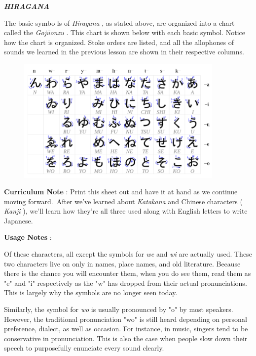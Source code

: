\par{\textbf{\emph{HIRAGANA }}}

\par{ The basic symbo ls of \emph{Hiragana }, as stated above, are organized into a chart called the \emph{Gojūonzu }. This chart is shown below with each basic symbol. Notice how the chart is organized. Stoke orders are listed, and all the allophones of sounds we learned in the previous lesson are shown in their respective columns. }
 
\begin{figure}[h]
\centering

\includegraphics[width=0.9\textwidth]{figs/第01章/第3課:_hiragana_fig/768px_Table_hiragana.svg.png}

\end{figure}

\par{\textbf{Curriculum Note }: Print this sheet out and have it at hand as we continue moving forward. After we've learned about \emph{Katakana }and Chinese characters ( \emph{Kanji }), we'll learn how they're all three used along with English letters to write Japanese. }

\par{\textbf{Usage Notes }: }

\par{Of these characters, all except the symbols for \emph{we }and \emph{wi }\emph{ }are actually used. These two characters live on only in names, place names, and old literature. Because there is the chance you will encounter them, when you do see them, read them as "e" and "i" respectively as the "w" has dropped from their actual pronunciations. This is largely why the symbols are no longer seen today. }

\par{ Similarly, the symbol for \emph{wo }is usually pronounced by "o" by most speakers. However, the traditional pronunciation "wo" is still heard depending on personal preference, dialect, as well as occasion. For instance, in music, singers tend to be conservative in pronunciation. This is also the case when people slow down their speech to purposefully enunciate every sound clearly. }

